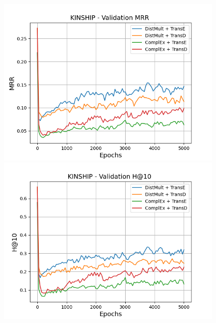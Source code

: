 \begin{figure}[H]
    \centering
    \begin{minipage}{.5\textwidth}
      \centering
      \includegraphics[width=\linewidth]{figures/results/gan_train/pretrained/random/kinship/random_kinship_mrrs.png}
    \end{minipage}%
    \begin{minipage}{.5\textwidth}
      \centering
      \includegraphics[width=\linewidth]{figures/results/gan_train/pretrained/random/kinship/random_kinship_hit10.png}
    \end{minipage}
    

\end{figure}
